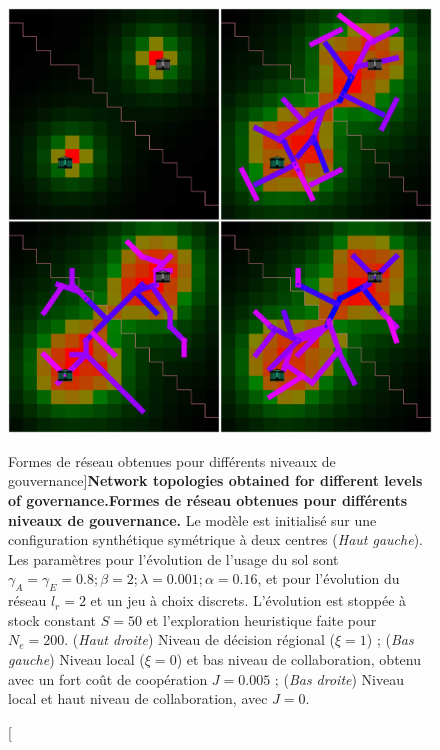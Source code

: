 \begin{figure}
	\includegraphics[width=\linewidth]{Figures/Final/7-3-3-fig-lutecia-governance.jpg}
	\caption[Network topologies obtained for different levels of governance][Formes de réseau obtenues pour différents niveaux de gouvernance]{\textbf{Network topologies obtained for different levels of governance.}\label{fig:lutecia:governance}}{\textbf{Formes de réseau obtenues pour différents niveaux de gouvernance.} Le modèle est initialisé sur une configuration synthétique symétrique à deux centres (\textit{Haut gauche}). Les paramètres pour l'évolution de l'usage du sol sont $\gamma_A = \gamma_E = 0.8 ; \beta = 2 ; \lambda = 0.001 ; \alpha = 0.16$, et pour l'évolution du réseau $l_r = 2$ et un jeu à choix discrets. L'évolution est stoppée à stock constant $S = 50$ et l'exploration heuristique faite pour $N_e = 200$. (\textit{Haut droite}) Niveau de décision régional ($\xi = 1$) ; (\textit{Bas gauche}) Niveau local ($\xi = 0$) et bas niveau de collaboration, obtenu avec un fort coût de coopération $J=0.005$ ; (\textit{Bas droite}) Niveau local et haut niveau de collaboration, avec $J=0$.\label{fig:lutecia:governance}}
\end{figure}



